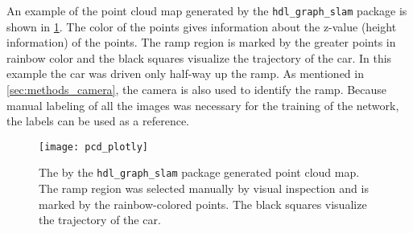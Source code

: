 An example of the point cloud map generated by the \texttt{hdl\_graph\_slam} package is shown in \cref{fig:pcd_plotly}.
The color of the points gives information about the z-value (height information) of the points.
The ramp region is marked by the greater points in rainbow color and the black squares visualize the trajectory of the car.
In this example the car was driven only half-way up the ramp.
As mentioned in \cref{sec:methods_camera}, the camera is also used to identify the ramp.
Because manual labeling of all the images was necessary for the training of the network, the labels can be used as a reference.
\begin{figure}[htb]
    \centering
    \texttt{[image: pcd\_plotly]}
    \caption[Generated point cloud map]{The by the \texttt{hdl\_graph\_slam} package generated point cloud map. The ramp region was selected manually by visual inspection and is marked by the rainbow-colored points. The black squares visualize the trajectory of the car.}
    \label{fig:pcd_plotly}
\end{figure}



